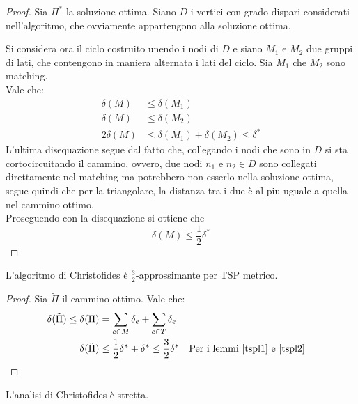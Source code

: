 \begin{proof}
    Sia $\Pi^*$ la soluzione ottima.
    Siano $D$ i vertici con grado dispari considerati nell'algoritmo, che ovviamente appartengono alla soluzione
    ottima.

    Si considera ora il ciclo costruito unendo i nodi di $D$ e siano $M_1$ e $M_2$ due gruppi di lati, 
    che contengono in maniera alternata i lati del ciclo.
    Sia $M_1$ che $M_2$ sono matching.\\
    Vale che:
    \begin{equation}
        \begin{aligned}
            \delta(M) &\leq \delta(M_1)\\
            \delta(M) &\leq \delta(M_2)\\
            2\delta(M) &\leq \delta(M_1) + \delta(M_2) \leq \delta^*
        \end{aligned}
    \end{equation}
    L'ultima disequazione segue dal fatto che, collegando i nodi che sono in $D$ si sta cortocircuitando il cammino, 
    ovvero, due nodi $n_1$ e $n_2 \in D$ sono collegati direttamente nel matching ma potrebbero non esserlo 
    nella soluzione ottima, segue quindi che per la triangolare, la distanza tra i due è al piu uguale a quella nel cammino 
    ottimo.\\
    Proseguendo con la disequazione si ottiene che
    $$\delta(M) \leq \frac{1}{2}\delta^*$$
\end{proof}
\begin{theorem}
    L'algoritmo di Christofides è $\frac{3}{2}$-approssimante per TSP metrico.
\end{theorem}
\begin{proof}
    Sia $\tilde{\Pi}$ il cammino ottimo.
    Vale che:
    \begin{equation}
        \begin{aligned}
            \delta(\tilde{\Pi}) \leq \delta(\Pi) &= \sum_{e \in M}\delta_e + \sum_{e \in T}\delta_e\\
            \delta(\tilde{\Pi}) &\leq \frac{1}{2}\delta^* + \delta^* \leq \frac{3}{2}\delta^* && \text{Per i lemmi \ref{tspl1} e \ref{tspl2}}\\
        \end{aligned}
    \end{equation}
\end{proof}
\begin{theorem}
    L'analisi di Christofides è stretta.
\end{theorem}
